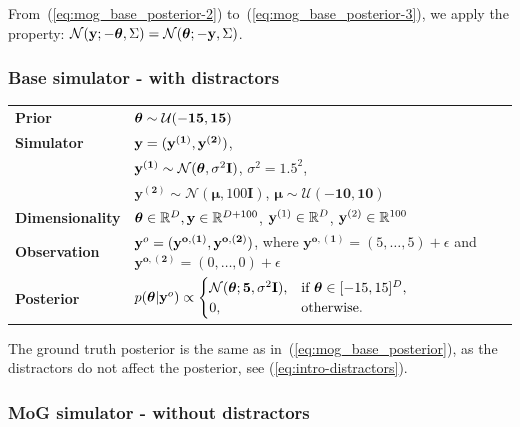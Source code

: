 From~(\ref{eq:mog_base_posterior-2}) to~(\ref{eq:mog_base_posterior-3}), we apply the property: $\mathcal{N}(\mathbf{y}; - \boldsymbol{\theta}, \Sigma) = \mathcal{N}(\boldsymbol{\theta}; - \mathbf{y} , \Sigma)$.


\subsubsection{Base simulator - with distractors}

\begin{tabular}{@{}ll@{}}
  \textbf{Prior} & $\boldsymbol{\theta} \sim \mathcal{U}(-\mathbf{15}, \mathbf{15})$ \\ [5pt]
  \textbf{Simulator} & $\mathbf{y} = (\mathbf{y^{(1)}}, \mathbf{y^{(2)}})$, \\ [5pt]
  & $\mathbf{y^{(1)}} \sim \mathcal{N}(\boldsymbol{\theta}, \sigma^2 \mathbf{I})$, $\sigma^2=1.5^2$, \\ [5pt]
  & $\mathbf{y^{(2)}} \sim \mathcal{N}(\boldsymbol{\mu}, 100 \mathbf{I})$, $\boldsymbol{\mu} \sim \mathcal{U}(-\mathbf{10}, \mathbf{10})$ \\ [5pt]
  \textbf{Dimensionality} & $\boldsymbol{\theta} \in \mathbb{R}^D,  \mathbf{y} \in \mathbb{R}^{D + 100}$, $\mathbf{y}^{(1)} \in \mathbb{R}^{D}$, $\mathbf{y}^{(2)} \in \mathbb{R}^{100}$\\ [5pt]
  \textbf{Observation} & $\mathbf{y}^o = (\mathbf{y^{o, (1)}}, \mathbf{y^{o, (2)}})$, where $\mathbf{y^{o, (1)}} = (5, \ldots, 5) + \epsilon$ and $\mathbf{y^{o, (2)}} = (0, \ldots, 0) + \epsilon$ \\ [5pt]
  \textbf{Posterior} & $ p(\boldsymbol{\theta} | \mathbf{y}^o) \propto
                                    \begin{cases}
                                      \mathcal{N}(\boldsymbol{\theta}; \mathbf{5}, \sigma^2 \mathbf{I}), & \text{if } \boldsymbol{\theta} \in [-15, 15]^D, \\
                                      0, & \text{otherwise}.
                                    \end{cases} $ \\ [5pt]
\end{tabular}

The ground truth posterior is the same as in~(\ref{eq:mog_base_posterior}), as the distractors do not affect the posterior, see (\ref{eq:intro-distractors}).

\subsubsection{MoG simulator - without distractors}

